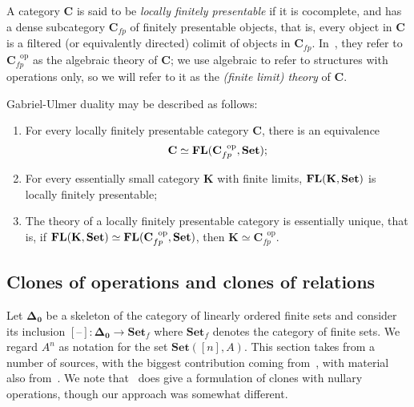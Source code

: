 \documentclass[11pt, a4paper, twoside,leqno]{amsart}
\newcommand{\cat}[1]{\mathbf{#1}}
\newcommand{\thg}{{\mathord{\text{--}}}}
\numberwithin{equation}{section}
\theoremstyle{plain}
\theoremstyle{definition}
\newcommand{\Set}{\cat{Set}}
\DeclareMathOperator{\FL}{\bf FL}
\begin{document}
A category \(\cat{C}\) is said to be \emph{locally finitely presentable} if it is
cocomplete, and has a dense subcategory \(\cat{C}_{fp}\) of finitely
presentable objects, that is, every object in \(\cat{C}\) is a filtered (or equivalently
directed) colimit of objects in \(\cat{C}_{fp}\).
In~\cite{Adamek:1998aa}, they refer to \(\cat{C}_{fp}^{\;\;\mathrm{op}}\)
as the algebraic theory of \(\cat{C}\); we use algebraic
to refer to structures with operations only, so we
will refer to it as the \emph{(finite limit) theory} of \(\cat{C}\).

Gabriel-Ulmer duality may be described as follows:
\begin{enumerate}[label=(\Roman*), ref=(\Roman*)]
  \item
    \label{it:lfp-to-th}
    For every locally finitely presentable category \(\cat{C}\), there is
an equivalence
\begin{equation*}
  \cat{C} \simeq \FL(\cat{C}_{fp}^{\;\;\mathrm{op}},\Set);
\end{equation*}
\item
  \label{it:th-to-lfp}
  For every essentially small category \(\cat{K}\) with finite
limits, \(\FL(\cat{K},\Set)\) is locally finitely
presentable;
\item
  \label{it:th-lfp-unique}
  The theory of a locally finitely presentable category is essentially
  unique, that is, if \( \FL(\cat{K},\Set) \simeq
\FL(\cat{C}_{fp}^{\;\;\mathrm{op}},\Set)\), then
\(\cat{K}\simeq \cat{C}_{fp}^{\;\;\mathrm{op}}\).
\end{enumerate}



\subsection{Clones of operations and clones of relations}
\label{sec:clones-rel-clones}

Let \(\cat{\Delta_{0}}\) be a skeleton of the category of linearly
ordered finite
sets and consider its inclusion \([\thg] \colon
\cat{\Delta_{0}} \rightarrow \cat{Set}_{f}\) where \(\cat{Set}_{f}\) denotes
the category of finite sets. We regard \(A^{n}\) as notation for the
set \(\Set([n],A)\). This section takes from a number of sources, with
the biggest contribution coming from~\cite{Freese:2022aa}, with
material also from~\cite{Kerkhoff:2014aa}. We note
  that~\cite{Behrisch:2014aa} does give a formulation of clones with
  nullary operations, though our approach was somewhat different.
\end{document}
